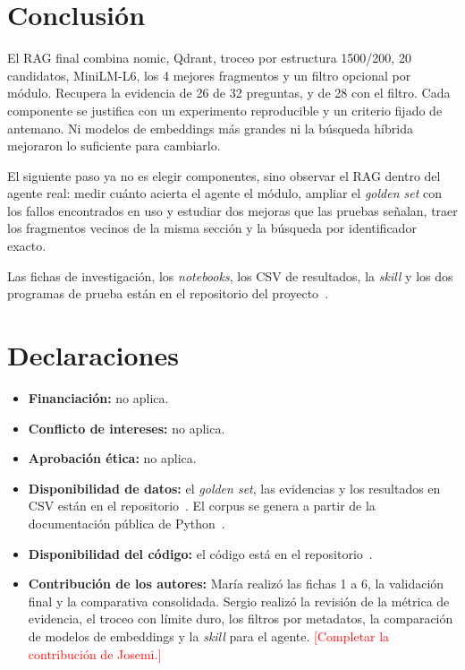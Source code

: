 \documentclass[pdflatex,sn-mathphys-num]{sn-jnl}
\begin{document}
\section{Conclusión}\label{sec:conclusion}

El RAG final combina nomic, Qdrant, troceo por estructura 1500/200, 20 candidatos, MiniLM-L6, los 4 mejores fragmentos y un filtro opcional por módulo. Recupera la evidencia de 26 de 32 preguntas, y de 28 con el filtro. Cada componente se justifica con un experimento reproducible y un criterio fijado de antemano. Ni modelos de embeddings más grandes ni la búsqueda híbrida mejoraron lo suficiente para cambiarlo.

El siguiente paso ya no es elegir componentes, sino observar el RAG dentro del agente real: medir cuánto acierta el agente el módulo, ampliar el \emph{golden set} con los fallos encontrados en uso y estudiar dos mejoras que las pruebas señalan, traer los fragmentos vecinos de la misma sección y la búsqueda por identificador exacto.

\backmatter

Las fichas de investigación, los \emph{notebooks}, los CSV de resultados, la \emph{skill} y los dos programas de prueba están en el repositorio del proyecto~\cite{repo}.

\section*{Declaraciones}

\begin{itemize}
\item \textbf{Financiación:} no aplica.
\item \textbf{Conflicto de intereses:} no aplica.
\item \textbf{Aprobación ética:} no aplica.
\item \textbf{Disponibilidad de datos:} el \emph{golden set}, las evidencias y los resultados en CSV están en el repositorio~\cite{repo}. El corpus se genera a partir de la documentación pública de Python~\cite{pythondocs}.
\item \textbf{Disponibilidad del código:} el código está en el repositorio~\cite{repo}.
\item \textbf{Contribución de los autores:} María realizó las fichas 1 a 6, la validación final y la comparativa consolidada. Sergio realizó la revisión de la métrica de evidencia, el troceo con límite duro, los filtros por metadatos, la comparación de modelos de embeddings y la \emph{skill} para el agente. \textcolor{red}{[Completar la contribución de Josemi.]}
\end{itemize}
\end{document}
